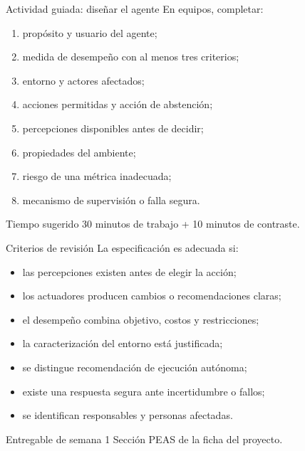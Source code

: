\documentclass[aspectratio=169,11pt]{beamer}
\begin{document}
\begin{frame}{Actividad guiada: diseñar el agente}
  \small
  En equipos, completar:
  \begin{enumerate}
    \item propósito y usuario del agente;
    \item medida de desempeño con al menos tres criterios;
    \item entorno y actores afectados;
    \item acciones permitidas y acción de abstención;
    \item percepciones disponibles antes de decidir;
    \item propiedades del ambiente;
    \item riesgo de una métrica inadecuada;
    \item mecanismo de supervisión o falla segura.
  \end{enumerate}
  \begin{block}{Tiempo sugerido}
    30 minutos de trabajo + 10 minutos de contraste.
  \end{block}
\end{frame}

\begin{frame}{Criterios de revisión}
  La especificación es adecuada si:
  \begin{itemize}
    \item las percepciones existen antes de elegir la acción;
    \item los actuadores producen cambios o recomendaciones claras;
    \item el desempeño combina objetivo, costos y restricciones;
    \item la caracterización del entorno está justificada;
    \item se distingue recomendación de ejecución autónoma;
    \item existe una respuesta segura ante incertidumbre o fallos;
    \item se identifican responsables y personas afectadas.
  \end{itemize}
  \begin{block}{Entregable de semana 1}
    Sección PEAS de la ficha del proyecto.
  \end{block}
\end{frame}
\end{document}
